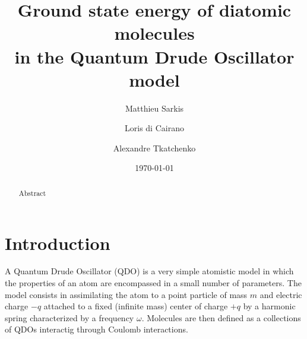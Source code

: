 \documentclass[reprint, amsmath, amssymb, aps, prl]{revtex4-2}
\begin{document}

\title{Ground state energy of diatomic molecules\\ in the Quantum Drude Oscillator model}

\author{Matthieu Sarkis}

\author{Loris di Cairano}%

\author{Alexandre Tkatchenko}%



\date{\today}

\begin{abstract}
Abstract
\end{abstract}

\maketitle


\section{Introduction}

    A Quantum Drude Oscillator (QDO) is a very simple atomistic model in which the properties of an atom are encompassed in a small number of parameters. The model consists in assimilating the atom to a point particle of mass $m$ and electric charge $-q$ attached to a fixed (infinite mass) center of charge $+q$ by a harmonic spring characterized by a frequency $\omega$. Molecules are then defined as a collections of QDOs interactig through Coulomb interactions.
\end{document}
